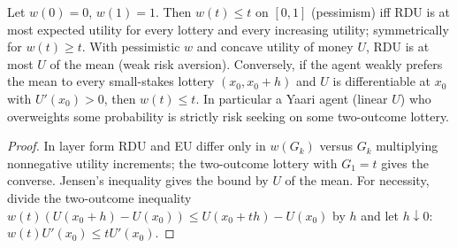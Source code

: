 \begin{theorem}
\label{thm:beh-rdu-risk}
\leanok
Let $w(0)=0$, $w(1)=1$. Then $w(t)\le t$ on $[0,1]$ (pessimism) iff RDU is at most expected utility for every lottery and
every increasing utility; symmetrically for $w(t)\ge t$. With pessimistic $w$ and concave utility of money $U$, RDU is at
most $U$ of the mean (weak risk aversion). Conversely, if the agent weakly prefers the mean to every small-stakes lottery
$(x_0,x_0+h)$ and $U$ is differentiable at $x_0$ with $U'(x_0)>0$, then $w(t)\le t$. In particular a Yaari agent (linear
$U$) who overweights some probability is strictly risk seeking on some two-outcome lottery.
\end{theorem}
\begin{proof}
\leanok
In layer form RDU and EU differ only in $w(G_k)$ versus $G_k$ multiplying nonnegative utility increments; the two-outcome
lottery with $G_1=t$ gives the converse. Jensen's inequality gives the bound by $U$ of the mean. For necessity, divide the
two-outcome inequality $w(t)(U(x_0+h)-U(x_0))\le U(x_0+th)-U(x_0)$ by $h$ and let $h\downarrow0$: $w(t)U'(x_0)\le
tU'(x_0)$.
\end{proof}

